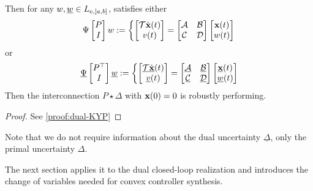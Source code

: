 \begin{theorem}
\begin{itemize}
\begin{minipage}[c]{\linewidth}
\begin{equation}
        \end{equation}
        \end{minipage}
    \end{itemize}
    Then for any $w,\underline{w}\in L_{{\mathrm{e}},[a,b]}$, satisfies either
    \begin{equation*}
        \Psi\begin{bmatrix}P\\I\end{bmatrix}w := \left\{ \begin{bmatrix}\mathcal{T} \dot{\mathbf{x}}(t) \\ v(t)\end{bmatrix} = \begin{bmatrix}\mathcal{A} & \mathcal{B}\\
        \mathcal{C} & \mathcal{D}\end{bmatrix}\begin{bmatrix}\mathbf{x}(t) \\ w(t)\end{bmatrix}\right.
    \end{equation*}
    or
    \begin{equation}\label{eq:dual-system}
        \underline{\Psi}\begin{bmatrix}P^\top\\I\end{bmatrix}\underline{w} := \left\{ \begin{bmatrix}\underline{\mathcal{T}} \dot{\underline{\mathbf{x}}}(t) \\ {\underline{v}}(t)\end{bmatrix} = \begin{bmatrix}\underline{\mathcal{A}} & \underline{\mathcal{B}}\\
        \underline{\mathcal{C}} & \underline{\mathcal{D}}\end{bmatrix}\begin{bmatrix}\underline{\mathbf{x}}(t) \\ \underline{w}(t)\end{bmatrix}\right.
    \end{equation}
    Then the interconnection $P\star\Delta$ with $\mathbf{x}(0) = 0$ is robustly performing.
\end{theorem}
\begin{proof}
    See \ref{proof:dual-KYP}
\end{proof}

\begin{remark}
    Note that we do not require information about the dual uncertainty $\underline{\Delta}$, only the primal uncertainty $\Delta$.
\end{remark}
The next section applies it to the
dual closed-loop realization and introduces the change of variables needed for
convex controller synthesis.
